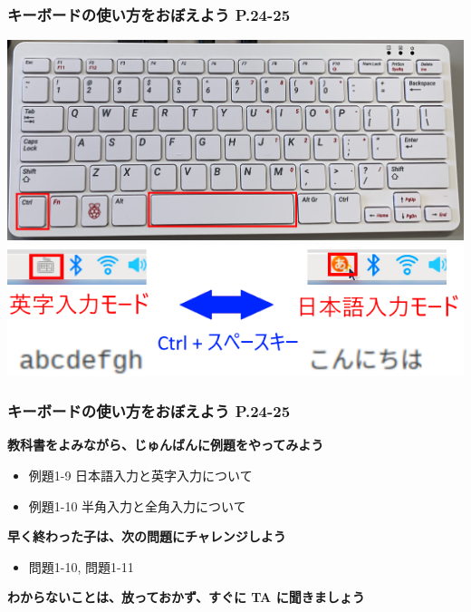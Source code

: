 \documentclass[dvipdfmx]{beamer}
\begin{document}
\begin{frame}[fragile]
	\frametitle{キーボードの使い方をおぼえよう P.24-25~~~}
    \includegraphics[width=\textwidth]{slide02_002.png}
    \vfill
    \includegraphics[width=\textwidth]{slide02_003.png}\\
\end{frame}

\begin{frame}[fragile]
	\frametitle{キーボードの使い方をおぼえよう P.24-25~~~}
    \large\textbf{教科書をよみながら、じゅんばんに例題をやってみよう}
    				\begin{itemize}
    					\item 例題1-9 日本語入力と英字入力について
    					\item 例題1-10 半角入力と全角入力について
    				\end{itemize}
          \vfill
          \large\textbf{早く終わった子は、次の問題にチャレンジしよう}
          \begin{itemize}
            \item 問題1-10, 問題1-11
          \end{itemize}
          \vfill
          \large\textbf{わからないことは、放っておかず、すぐに TA に聞きましょう}
\end{frame}
\end{document}
